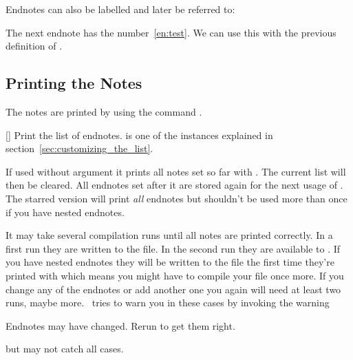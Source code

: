 \documentclass[load-preamble+]{cnltx-doc}
\begin{document}
\makeatletter
\def\endnotemark{\@ifnextchar[{\@endnotemark}{\@endnotemark[\theendnote]}}
\def\@endnotemark[#1]{\enotezwritemark{\enmarkstyle#1}}
\makeatother

Endnotes can also be labelled and later be referred to:
\begin{example}
  The next endnote\label{en:test} has
  the number~\ref{en:test}.  We can use this with the previous definition
  of \endnotemark[\ref{en:test}].
\end{example}

\subsection{Printing the Notes}
The notes are printed by using the command .
\begin{commands}
  [\sarg{}]
    Print the list of endnotes.  is one of the instances
    explained in section~\ref{sec:customizing_the_list}.
\end{commands}
If used without argument it prints all notes set so far with
. The current list will then be cleared.  All endnotes set after
it are stored again for the next usage of .  The starred
version will print \emph{all} endnotes but shouldn't be used more than once if
you have nested endnotes.

It may take several compilation runs until all notes are printed correctly.
In a first run they are written to the  file.  In the second run
they are available to .  If you have nested endnotes they
will be written to the  file the first time they're printed with
 which means you might have to compile your file once more.
If you change any of the endnotes or add another one you again will need at
least two runs, maybe more.  \enotez\ tries to warn you in these cases by
invoking the warning
\begin{flushleft}
  \ttfamily
  Endnotes may have changed.  Rerun to get them right.
\end{flushleft}
but may not catch all cases.
\end{document}
